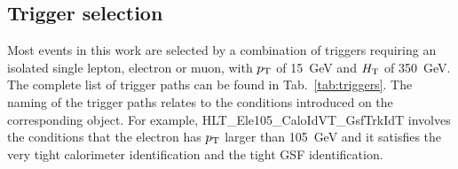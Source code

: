 \subsection{Trigger selection}
\label{sec:triggers}
Most events in this work are selected by a combination of triggers requiring an isolated single lepton, electron or muon, with $p_{\rm T}$ of 15~GeV and $H_{\rm T}$ of 350~GeV. 
The complete list of trigger paths can be found in Tab.~\ref{tab:triggers}. The naming of the trigger paths relates to the conditions introduced on the corresponding object. For example, HLT\_Ele105\_CaloIdVT\_GsfTrkIdT involves the conditions that the electron has $p_{\rm T}$ larger than 105~GeV and it satisfies the very tight calorimeter identification and the tight GSF identification.\\
\renewcommand{\arraystretch}{1.5}
\begin{table}[!h]
\begin{center}
\caption{List of HLT paths. Notation is used in terms of CMS internal shortcuts.}\label{tab:triggers}
\end{center}
\end{table}
